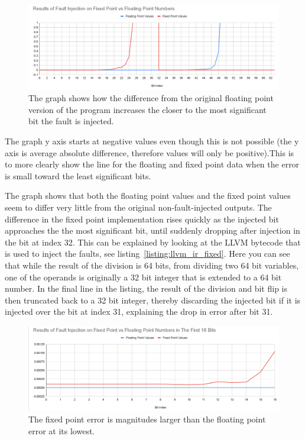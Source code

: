 \begin{figure}[h!]
    \centering
    \includegraphics[width=0.5\linewidth]{Images/graph_float_vs_fixed_fault_injection_results.png}
    \caption{The graph shows how the difference from the original floating point version of the program increases the closer to the most significant bit the fault is injected. }
    \label{fig:graph_fixed_vs_float_error}
\end{figure}


The graph y axis starts at negative values even though this is not possible (the y axis is average absolute difference, therefore values will only be positive).This is to more clearly show the line for the floating and fixed point data when the error is small toward the least significant bits.

The graph shows that both the floating point values and the fixed point values seem to differ very little from the original non-fault-injected outputs. The difference in the fixed point implementation rises quickly as the injected bit approaches the the most significant bit, until suddenly dropping after injection in the bit at index 32. This can be explained by looking at the LLVM bytecode that is used to inject the faults, see listing~\ref{listing:llvm_ir_fixed}. Here you can see that while the result of the division is 64 bits, from dividing two 64 bit variables, one of the operands is originally a 32 bit integer that is extended to a 64 bit number. In the final line in the listing, the result of the division and bit flip is then truncated back to a 32 bit integer, thereby discarding the injected bit if it is injected over the bit at index 31, explaining the drop in error after bit 31.

\begin{figure}[h!]
    \centering
    \includegraphics[width=0.5\linewidth]{graph_fault_injection_fix_vs_float_first_16_bits.png}
    \caption{The fixed point error is magnitudes larger than the floating point error at its lowest.}
    \label{fig:graph_fixed_vs_float_error_first_16}
\end{figure}


